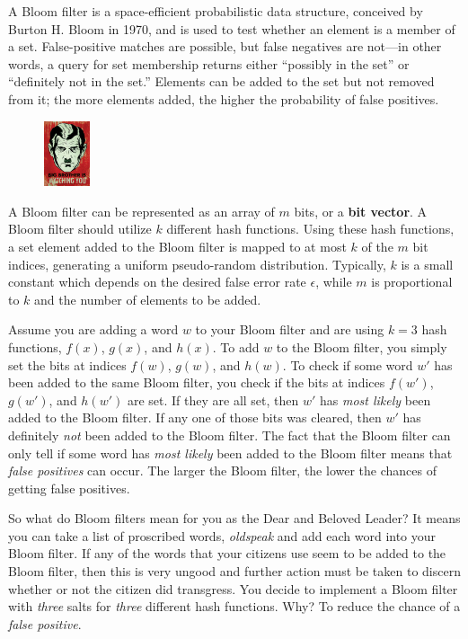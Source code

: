 \documentclass{article}
\begin{document}
A Bloom filter is a space-efficient probabilistic data structure,
conceived by Burton H. Bloom in 1970, and is used to test whether
an element is a member of a set. False-positive matches are possible,
but false negatives are not---in other words, a query for set membership
returns either ``possibly in the set'' or ``definitely not in the set.''
Elements can be added to the set but not removed from it; the more
elements added, the higher the probability of false positives.

\begin{figure}
\centering
\includegraphics[width=0.12\textwidth]{images/1984-Big-Brother.jpg}
\end{figure}

A Bloom filter can be represented as an array of $m$ bits, or a
\textbf{bit vector}. A Bloom filter should utilize $k$ different hash
functions. Using these hash functions, a set element added to the Bloom
filter is mapped to at most $k$ of the $m$ bit indices, generating a
uniform pseudo-random distribution. Typically, $k$ is a small constant
which depends on the desired false error rate $\epsilon$, while $m$ is
proportional to $k$ and the number of elements to be added.

Assume you are adding a word $w$ to your Bloom filter and are using
$k=3$ hash functions, $f(x)$, $g(x)$, and $h(x)$. To add $w$ to the
Bloom filter, you simply set the bits at indices $f(w)$, $g(w)$, and
$h(w)$. To check if some word $w'$ has been added to the same Bloom
filter, you check if the bits at indices $f(w')$, $g(w')$, and $h(w')$
are set. If they are all set, then $w'$ has \emph{most likely} been
added to the Bloom filter. If any one of those bits was cleared, then
$w'$ has definitely \emph{not} been added to the Bloom filter. The fact
that the Bloom filter can only tell if some word has \emph{most likely}
been added to the Bloom filter means that \emph{false positives} can
occur. The larger the Bloom filter, the lower the chances of getting
false positives.

So what do Bloom filters mean for you as the Dear and Beloved Leader?
It means you can take a list of proscribed words, \emph{oldspeak} and
add each word into your Bloom filter. If any of the words that your
citizens use seem to be added to the Bloom filter, then this is very
ungood and further action must be taken to discern whether or not the
citizen did transgress. You decide to implement a Bloom filter with
\emph{three} salts for \emph{three} different
hash functions. Why? To reduce the chance of a \emph{false positive}.
\end{document}

